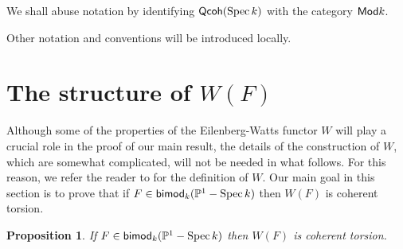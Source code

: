 \documentclass[10pt]{amsart}
\newtheorem{prop}[lemma]{Proposition}
\theoremstyle{definition}
\theoremstyle{remark}
\numberwithin{equation}{section}
\begin{document}
We shall abuse notation by identifying ${\sf Qcoh }(\operatorname{Spec }k)$ with the category ${\sf Mod }k$.

Other notation and conventions will be introduced locally.
\medskip

\section{The structure of $W(F)$} \label{section.wf}
 Although some of the properties of the Eilenberg-Watts functor $W$ will play a crucial role in the proof of our main result, the details of the construction of $W$, which are somewhat complicated, will not be needed in what follows.  For this reason, we refer the reader to \cite[Section 5]{N} for the definition of $W$.  Our main goal in this section is to prove that if $F \in {\sf bimod }_{k}(\mathbb{P}^{1}-\operatorname{Spec }k)$ then $W(F)$ is coherent torsion.

\begin{prop} \label{prop.coherent}
If $F \in {\sf bimod }_{k}(\mathbb{P}^{1}-\operatorname{Spec }k)$ then $W(F)$ is coherent torsion.
\end{prop}
\end{document}
